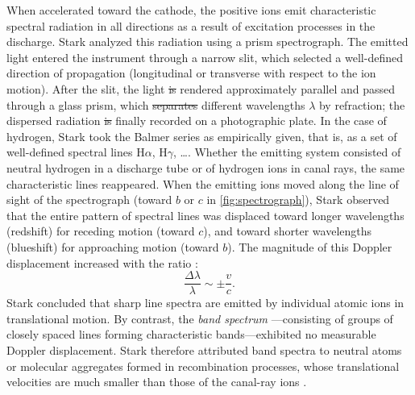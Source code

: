 \documentclass[submitted,12pt]{article} %
\providecommand{\DIFadd}[1]{{\protect\color{blue}\uwave{#1}}} %
\providecommand{\DIFdel}[1]{{\protect\color{red}\sout{#1}}}                      %
\providecommand{\DIFaddbegin}{} %
\providecommand{\DIFaddend}{} %
\providecommand{\DIFdelbegin}{} %
\providecommand{\DIFdelend}{} %
\begin{document}
When accelerated toward the cathode, the positive ions emit characteristic spectral radiation in all directions as a result of excitation processes in the discharge. Stark analyzed this radiation using a prism spectrograph. The emitted light entered the instrument through a narrow slit, which selected a well-defined direction of propagation (longitudinal or transverse with respect to the ion motion). After \DIFaddbegin \DIFadd{passing through }\DIFaddend the slit, the light \DIFdelbegin \DIFdel{is }\DIFdelend \DIFaddbegin \DIFadd{was }\DIFaddend rendered approximately parallel and passed through a glass prism, which \DIFdelbegin \DIFdel{separates }\DIFdelend \DIFaddbegin \DIFadd{separated }\DIFaddend different wavelengths $\lambda$ by refraction; the dispersed radiation \DIFdelbegin \DIFdel{is }\DIFdelend \DIFaddbegin \DIFadd{was }\DIFaddend finally recorded on a photographic plate. In the case of hydrogen, Stark took the Balmer series as empirically given, that is, as a set of well-defined spectral lines $\mathrm{H}\alpha$, $\mathrm{H}\gamma$, \dots \citep[417]{Stark1906}. Whether the emitting system consisted of neutral hydrogen in a discharge tube or of hydrogen ions in canal rays, the same characteristic lines reappeared. When the emitting ions moved along the line of sight of the spectrograph (toward $b$ or $c$ in \cref{fig:spectrograph}), Stark observed that the entire pattern of spectral lines was displaced toward longer wavelengths (redshift) for receding motion (toward $c$), and toward shorter wavelengths (blueshift) for approaching motion (toward $b$). The magnitude of this Doppler displacement increased with the ratio \betafactorh:
%
\begin{equation*}
\frac{\Delta\lambda}{\lambda} \sim \pm \frac{v}{c}.
\end{equation*}
%
Stark concluded that sharp line spectra  are emitted by individual atomic ions in translational motion. By contrast, the \emph{band spectrum} ---consisting of groups of closely spaced lines forming characteristic bands---exhibited no measurable Doppler displacement. Stark therefore attributed band spectra to neutral atoms or molecular aggregates formed in recombination processes, whose translational velocities are much smaller than those of the canal-ray ions \citep[426]{Stark1906}.
\end{document}
